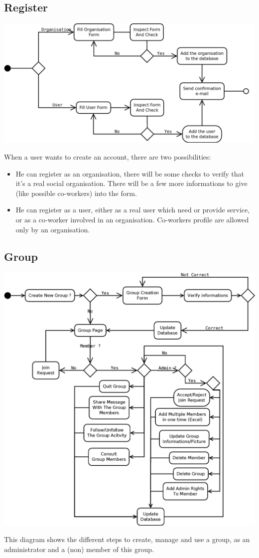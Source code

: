 \subsection{Register}

\begin{center}
	\includegraphics[width=.9\textwidth]{Register.png}
\end{center}
When a user wants to create an account, there are two possibilities:
\begin{itemize}
\item He can register as an organisation, there will be some checks to verify that it's a real social organisation. There will be a few more informations to give (like possible co-workers) into the form.
\item He can register as a user, either as a real user which need or provide service, or as a co-worker involved in an organisation. Co-workers profile are allowed only by an organisation.
\end{itemize}

\subsection{Group}

\begin{center}
	\includegraphics[width=.95\textwidth]{Group.png}
\end{center}
This diagram shows the different steps to create, manage and use a group, as an administrator and a (non) member of this group.

